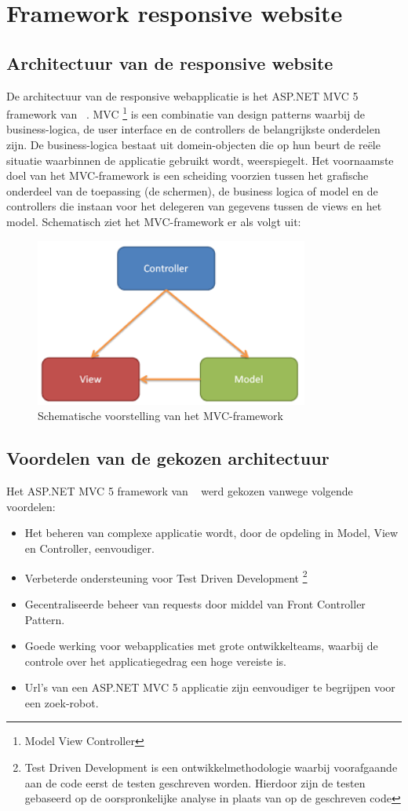 \chapter{Framework responsive website}
\label{ch:frameworkresponsivewebsite}
\section{Architectuur van de responsive website}
De architectuur van de responsive webapplicatie is het ASP.NET MVC 5 framework van ~\cite{aspnetmvcoverview2017}.
MVC \footnote{Model View Controller} is een combinatie van design patterns waarbij de business-logica, de user interface en de controllers de belangrijkste
onderdelen zijn. De business-logica bestaat uit domein-objecten die op hun beurt de reële situatie waarbinnen de applicatie
gebruikt wordt, weerspiegelt. Het voornaamste doel van het MVC-framework is een scheiding voorzien tussen het grafische
onderdeel van de toepassing (de schermen), de business logica of model en de controllers die instaan voor het delegeren van gegevens
tussen de views en het model. Schematisch ziet het MVC-framework er als volgt uit:
\begin{figure}[ht!]
\centering
\caption{Schematische voorstelling van het MVC-framework \cite{crossplatformmobiledevelopmentinvisualstudio2017}}
\includegraphics[width=90mm]{./img/mvc.png}
\end{figure}
\section{Voordelen van de gekozen architectuur}
Het ASP.NET MVC 5 framework van ~\cite{aspnetmvcoverview2017} werd gekozen vanwege volgende voordelen:
\begin{itemize}
  \item Het beheren van complexe applicatie wordt, door de opdeling in Model, View en Controller, eenvoudiger.
  \item Verbeterde ondersteuning voor Test Driven Development \footnote{Test Driven Development is een ontwikkelmethodologie waarbij voorafgaande aan de code eerst de testen geschreven worden. Hierdoor zijn de testen gebaseerd op de oorspronkelijke analyse in plaats van op de geschreven code}
  \item Gecentraliseerde beheer van requests door middel van Front Controller Pattern.
  \item Goede werking voor webapplicaties met grote ontwikkelteams, waarbij de controle over het applicatiegedrag een hoge vereiste is.
  \item Url's van een ASP.NET MVC 5 applicatie zijn eenvoudiger te begrijpen voor een zoek-robot.
\end{itemize}

